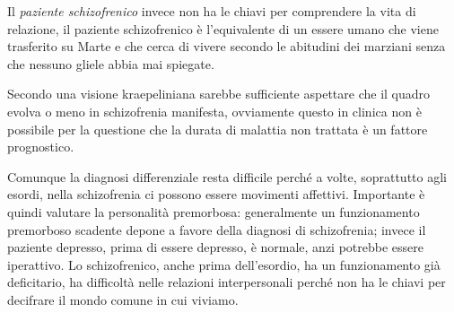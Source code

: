 Il \emph{paziente schizofrenico} invece non ha le chiavi per comprendere
la vita di relazione, il paziente schizofrenico è l'equivalente di un
essere umano che viene trasferito su Marte e che cerca di vivere secondo
le abitudini dei marziani senza che nessuno gliele abbia mai spiegate.

Secondo una visione kraepeliniana sarebbe sufficiente aspettare che il
quadro evolva o meno in schizofrenia manifesta, ovviamente questo in
clinica non è possibile per la questione che la durata di malattia non
trattata è un fattore prognostico.

Comunque la diagnosi differenziale resta difficile perché a volte,
soprattutto agli esordi, nella schizofrenia ci possono essere movimenti
affettivi. Importante è quindi valutare la personalità premorbosa:
generalmente un funzionamento premorboso scadente depone a favore della
diagnosi di schizofrenia; invece il paziente depresso, prima di essere
depresso, è normale, anzi potrebbe essere iperattivo. Lo schizofrenico,
anche prima dell'esordio, ha un funzionamento già deficitario, ha
difficoltà nelle relazioni interpersonali perché non ha le chiavi per
decifrare il mondo comune in cui viviamo.
